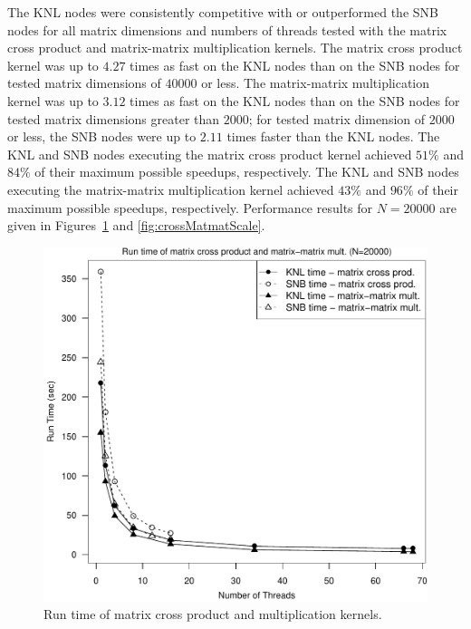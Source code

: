 The KNL nodes were consistently competitive with or outperformed the
  SNB nodes for all matrix dimensions and numbers of threads tested
  with the matrix cross product and matrix-matrix multiplication
  kernels.
The matrix cross product kernel was up to $4.27$ times as fast on the KNL
  nodes than on the SNB nodes for tested matrix dimensions of $40000$ or less.
The matrix-matrix multiplication kernel was up to $3.12$ times as fast on the
  KNL nodes than on the SNB nodes for tested matrix dimensions greater than
  $2000$; for tested matrix dimension of $2000$ or less, the SNB nodes were
  up to $2.11$ times faster than the KNL nodes.
The KNL and SNB nodes executing the matrix cross product kernel achieved $51\%$
  and $84\%$ of their maximum possible speedups, respectively.
The KNL and SNB nodes executing the matrix-matrix multiplication kernel achieved
  $43\%$ and $96\%$ of their maximum possible speedups, respectively.
Performance results for $N=20000$ are given in Figures~\ref{fig:crossMatmatTime}
  and \ref{fig:crossMatmatScale}.
\begin{figure}
\includegraphics[height=\columnwidth, width=\columnwidth]{cross_matmat_20000_68-rt.pdf}
\caption{Run time of matrix cross product and multiplication kernels.}
\label{fig:crossMatmatTime}
\end{figure}
